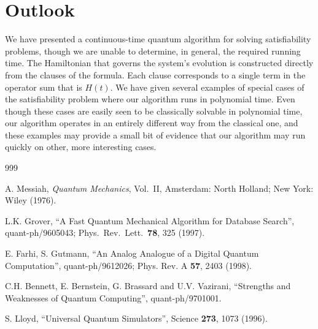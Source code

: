 \documentclass[twoside]{article}
\numberwithin{equation}{section}
\begin{document}
\section{Outlook}\label{sec:outlook} We have presented a continuous-time
quantum algorithm for solving satisfiability problems, though we are
unable to determine, in general, the required running time.  The
Hamiltonian that governs the system's evolution is constructed directly
from the clauses of the formula. Each clause corresponds to a single term in
the operator sum that is $H(t)$.  We have given several examples of special
cases of the satisfiability problem where our algorithm runs in polynomial
time.  Even though these cases are easily seen to be classically solvable in
polynomial time, our algorithm operates in an entirely different way from
the classical one, and  these examples may provide a small bit of evidence
that our algorithm may run quickly on other, more interesting cases.



\begin{thebibliography}{999}

 A. Messiah, \emph{Quantum Mechanics}, Vol.~II,
Amsterdam: North Holland; New York: Wiley (1976).

 L.K. Grover, ``A Fast Quantum Mechanical Algorithm for
Database Search'', quant-ph/9605043; Phys.\ Rev.\ Lett.\ {\bf 78}, 325
(1997).

 E. Farhi,  S. Gutmann, ``An Analog Analogue of a Digital
Quantum Computation'', quant-ph/9612026; Phys. Rev. A {\bf 57}, 2403
(1998). 

 C.H. Bennett, E. Bernstein, G. Brassard and U.V. Vazirani,
``Strengths and Weaknesses of Quantum Computing'', quant-ph/9701001.

 S. Lloyd, ``Universal Quantum Simulators'',  Science {\bf
273}, 1073 (1996). 

\end{thebibliography}
\end{document}
